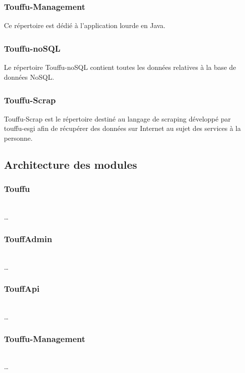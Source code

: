 \documentclass[conference]{IEEEtran}
\newcommand{\bibRef}[1]
{\textsuperscript{\cite{#1}}}
\begin{document}
\subsubsection*{Touffu-Management\bibRef{Touffu-Management} }

Ce répertoire est dédié à l'application lourde en Java.\\

\subsubsection*{Touffu-noSQL\bibRef{Touffu-noSQL} }

Le répertoire Touffu-noSQL contient toutes les données relatives à la base de données NoSQL.\\

\subsubsection*{Touffu-Scrap\bibRef{Touffu-Scrap} }

Touffu-Scrap est le répertoire destiné au langage de scraping développé par touffu-esgi afin de récupérer des données sur Internet au sujet des services à la personne.\\

\subsection{Architecture des modules}

\subsubsection*{Touffu}
\hfil\\
…\\

\subsubsection*{TouffAdmin}
\hfil\\
…\\

\subsubsection*{TouffApi}
\hfil\\
…\\

\subsubsection*{Touffu-Management}
\hfil\\
…\\
\end{document}
